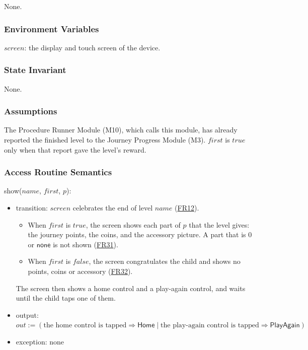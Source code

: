 \documentclass[10pt, titlepage]{article}
\newcommand{\srsurl}{https://team-hindsight.github.io/ophthamology-game/SRS/SRS.pdf}
\newcommand{\srsitemref}[2]{\href{\srsurl\#nameddest=#1}{#2}}
\newcommand{\T}[1]{\mathit{#1}}          %
\newcommand{\V}[1]{\mathsf{#1}}          %
\newcommand{\out}{\mathit{out}}
\newcommand{\true}{\mathit{true}}
\newcommand{\false}{\mathit{false}}
\begin{document}
None.

\subsubsection{Environment Variables}

$\T{screen}$: the display and touch screen of the device.

\subsubsection{State Invariant}

None.

\subsubsection{Assumptions}

The Procedure Runner Module (M10), which calls this module, has already
reported the finished level to the Journey Progress Module (M3). $\T{first}$ is
$\true$ only when that report gave the level's reward.

\subsubsection{Access Routine Semantics}

\noindent show($\T{name}$, $\T{first}$, $p$):
\begin{itemize}
\item transition: $\T{screen}$ celebrates the end of level $\T{name}$
  (\srsitemref{FR_LevelEnd}{FR12}).
  \begin{itemize}
  \item When $\T{first}$ is $\true$, the screen shows each part of $p$ that the
    level gives: the journey points, the coins, and the accessory picture. A
    part that is 0 or $\V{none}$ is not shown
    (\srsitemref{FR_FirstReward}{FR31}).
  \item When $\T{first}$ is $\false$, the screen congratulates the child and
    shows no points, coins or accessory
    (\srsitemref{FR_NoDuplicateReward}{FR32}).
  \end{itemize}
  The screen then shows a home control and a play-again control, and waits
  until the child taps one of them.
\item output: $\out := (\text{the home control is tapped} \Rightarrow
  \V{Home} \mid \text{the play-again control is tapped} \Rightarrow
  \V{PlayAgain})$
\item exception: none
\end{itemize}
\end{document}
